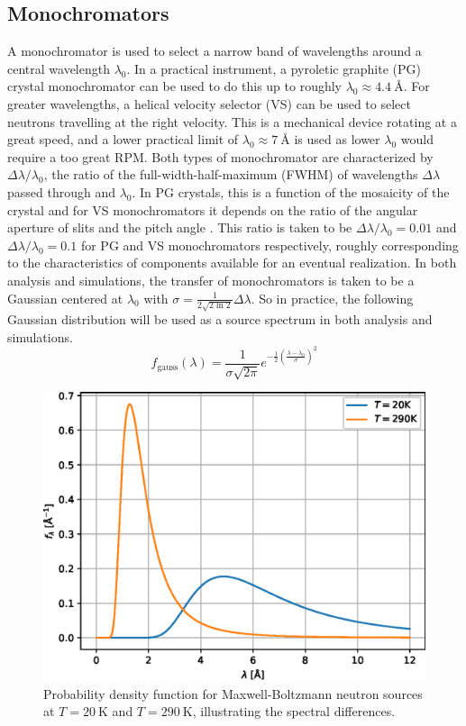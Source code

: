 \subsection{Monochromators}
A monochromator is used to select a narrow band of wavelengths around a central wavelength $\lambda_0$. In a practical instrument, a pyroletic graphite (PG) crystal monochromator can be used to do this up to roughly $\lambda_0 \approx \SI{4.4}{\angstrom}$. For greater wavelengths, a helical velocity selector (VS) can be used to select neutrons travelling at the right velocity. This is a mechanical device rotating at a great speed, and a lower practical limit of $\lambda_0 \approx \SI{7}{\angstrom}$ is used as lower $\lambda_0$ would require a too great RPM. Both types of monochromator are characterized by $\Delta\lambda/\lambda_0$, the ratio of the full-width-half-maximum (FWHM) of wavelengths $\Delta\lambda$ passed through and $\lambda_0$. In PG crystals, this is a function of the mosaicity of the crystal \cite{shapiro1972} and for VS monochromators it depends on the ratio of the angular aperture of slits and the pitch angle \cite{szewc2010}. This ratio is taken to be $\Delta\lambda/\lambda_0 = 0.01$ and $\Delta\lambda/\lambda_0 = 0.1$ for PG and VS monochromators respectively, roughly corresponding to the characteristics of components available for an eventual realization. In both analysis and simulations, the transfer of monochromators is taken to be a Gaussian centered at $\lambda_0$ with $\sigma = \frac{1}{2\sqrt{2\ln 2}}\Delta\lambda$. So in practice, the following Gaussian distribution will be used as a source spectrum in both analysis and simulations.
\begin{equation}
	f_\text{gauss}(\lambda) = \frac{1}{\sigma\sqrt{2\pi}} e^{-\frac{1}{2}(\frac{\lambda - \lambda_0}{\sigma})^2} \label{eq:gauss-spectrum}
\end{equation}
\begin{figure}
	\centering
	\includegraphics[width=0.5\linewidth]{source-spectrum}
	\caption{Probability density function for Maxwell-Boltzmann neutron sources at $T = \SI{20}{\kelvin}$ and $T = \SI{290}{\kelvin}$, illustrating the spectral differences. }
	\label{fig:source-spectrum}
\end{figure}
